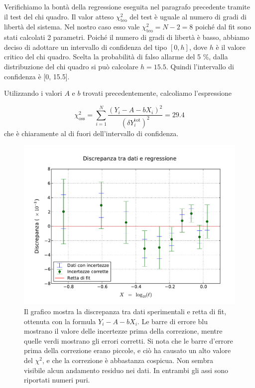 Verifichiamo la bontà della regressione eseguita nel paragrafo precedente tramite il test del chi quadro.
Il valor atteso $\chi^2_{\text{teo}}$ del test è uguale al numero di gradi di libertà del sistema. Nel nostro caso
esso vale $\chi^2_{\text{teo}} = N - 2 = 8$ poiché dal fit sono stati calcolati 2 parametri. Poiché
il numero di gradi di libertà è basso, abbiamo deciso di adottare un intervallo di confidenza del tipo $[0, h]$,
dove $h$ è il valore critico del chi quadro. Scelta la probabilità di falso allarme del 5 \%, dalla distribuzione
del chi quadro si può calcolare $h = 15.5$. Quindi l'intervallo di confidenza è [0, 15.5]. 

Utilizzando i valori $A$ e $b$ trovati precedentemente, calcoliamo l'espressione

\begin{equation}
    \chi^2_{\text{oss}} = \sum_{i=1}^N \frac{(Y_i - A - bX_i)^2}{(\delta Y_i^{\text{tot}})^2} = 29.4
\end{equation}
%
che è chiaramente al di fuori dell'intervallo di confidenza.

\begin{figure}
    \centering
    \includegraphics[width=115mm]{immagini/l_discrepanza.pdf}
    \caption{Il grafico mostra la discrepanza tra dati sperimentali e retta di fit, ottenuta con la formula $Y_i - A - bX_i$.
        Le barre di errore blu mostrano il valore delle incertezze prima della correzione, mentre quelle verdi mostrano gli errori
        corretti. Si nota che le barre d'errore prima della correzione erano piccole, e ciò ha causato un alto
        valore del $\chi^2$, e che la correzione è abbastanza cospicua. Non sembra visibile alcun andamento residuo nei dati.
        In entrambi gli assi sono riportati numeri puri.}
    \label{fig:l_discrepanza}
\end{figure}

